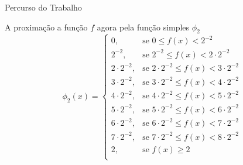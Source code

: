 	\begin{frame}{Percurso do Trabalho}
		\begin{block}{A	proximação a função $f$ agora pela função simples $\phi_2$}
			$$
			\phi_2(x) =\left\{
			\begin{array}{ll}
				0, & \textrm{se\ } 0 \leq f(x) < 2^{-2} \\
				2^{-2}, & \textrm{se\ } 2^{-2} \leq f(x) < 2\cdot2^{-2} \\
				2\cdot 2^{-2}, & \textrm{se\ } 2\cdot 2^{-2} \leq f(x) < 3\cdot2^{-2}\\
				3\cdot 2^{-2}, & \textrm{se\ } 3\cdot 2^{-2} \leq f(x) < 4\cdot2^{-2}\\
				4\cdot 2^{-2}, & \textrm{se\ } 4\cdot 2^{-2} \leq f(x) < 5\cdot2^{-2}\\
				5\cdot 2^{-2}, & \textrm{se\ } 5\cdot 2^{-2} \leq f(x) < 6\cdot2^{-2}\\
				6\cdot 2^{-2}, & \textrm{se\ } 6\cdot 2^{-2} \leq f(x) < 7\cdot2^{-2}\\
				7\cdot 2^{-2}, & \textrm{se\ } 7\cdot 2^{-2} \leq f(x) < 8\cdot2^{-2}\\
				2, & \textrm{se\ } f(x) \geq 2\\
			\end{array}
			\right.
			$$
		\end{block}
	\end{frame}

